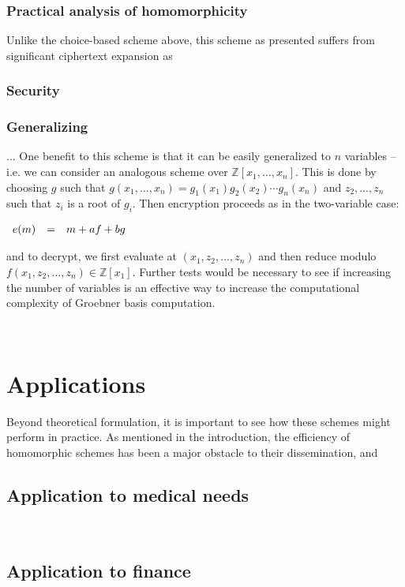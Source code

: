 \documentclass[11pt]{report}
\newcommand{\Z}{\mathbb{Z}}
\newcommand{\ba}{\\ \begin{array}{rcl}}
\newcommand{\ea}{\end{array} \\}
\newcommand{\Zxn}{\mathbb{Z}[x_1,\ldots,x_n]}
\begin{document}
\subsection{Practical analysis of homomorphicity}
Unlike the choice-based scheme above, this scheme as presented suffers from significant ciphertext expansion as 


\subsection{Security}
\label{sec:mv_security}

\subsection{Generalizing}

... One benefit to this scheme is that it can be easily generalized to $n$ variables -- i.e. we can consider an analogous scheme over $\Zxn$. This is done by choosing $g$ such that $g(x_1,\ldots,x_n) = g_1(x_1)g_2(x_2)\cdots g_n(x_n)$ and $z_2,\ldots,z_n$ such that $z_i$ is a root of $g_i$. Then encryption proceeds as in the two-variable case:

$\ba
e(m) & = & m + af + bg
\ea$

and to decrypt, we first evaluate at $(x_1,z_2,\ldots,z_n)$ and then reduce modulo $f(x_1,z_2,\ldots,z_n) \in \Z[x_1]$. Further tests would be necessary to see if increasing the number of variables is an effective way to increase the computational complexity of Groebner basis computation. 

\


\chapter{Applications}

Beyond theoretical formulation, it is important to see how these schemes might perform in practice. As mentioned in the introduction, the efficiency of homomorphic schemes has been a major obstacle to their dissemination, and 

\section{Application to medical needs}

\

\section{Application to finance}
\end{document}
